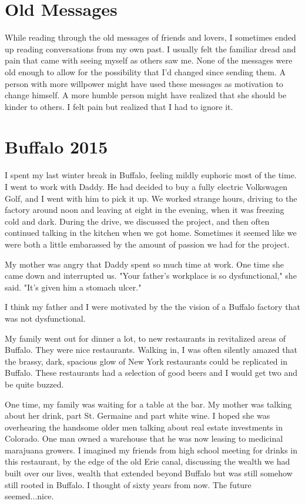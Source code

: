 \documentclass[12pt]{article}
\begin{document}
\section{Old Messages}
While reading through the old messages of friends and lovers, I sometimes ended
up reading conversations from my own past.  I usually felt the familiar dread
and pain that came  with seeing myself as others saw me.  None of the messages
were old enough to allow for the possibility that I'd changed since sending
them.  A person with more willpower might have used these messages as motivation
to change himself.  A more humble person might have realized that she should be
kinder to others.  I felt pain but realized that I had to ignore it.

\section{Buffalo 2015}

I spent my last winter break in Buffalo, feeling mildly euphoric most of the
time.  I went to work with Daddy.  He had decided to buy a fully electric
Volkswagen Golf, and I went with him to pick it up.  We worked strange hours,
driving to the factory around noon and leaving at eight in the evening, when it
was freezing cold and dark.  During the drive, we discussed the project, and
then often continued talking in the kitchen when we got home.  Sometimes it
seemed like we were both a little embarassed by the amount of passion we
had for the project. 

My mother was angry that Daddy spent so much time at work.  One time she
came down and interrupted us.  "Your father's workplace is so dysfunctional,"
she said.  "It's given him a stomach ulcer."  

I think my father and I were motivated by the the vision of a Buffalo factory
that was not dysfunctional. 

My family went out for dinner a lot, to new restaurants in revitalized areas of
Buffalo.  They were nice restaurants.  Walking in, I was often silently amazed
that the brassy, dark, spacious glow of New York restaurants could be replicated
in Buffalo.  These restaurants had a selection of good beers and I would get two
and be quite buzzed.

One time, my family was waiting for a table at the bar.  My mother was talking
about her drink, part St. Germaine and part white wine.  I hoped she was
overhearing the handsome older men talking about real estate investments in
Colorado.  One man owned a warehouse that he was now leasing to medicinal
marajuana growers.  I imagined my friends from high school meeting for drinks in
this restaurant, by the edge of the old Erie canal, discussing the wealth we had
built over our lives, wealth that extended beyond Buffalo but was still somehow
still rooted in Buffalo.  I thought of sixty years from now.  The future
seemed...nice.
\end{document}
